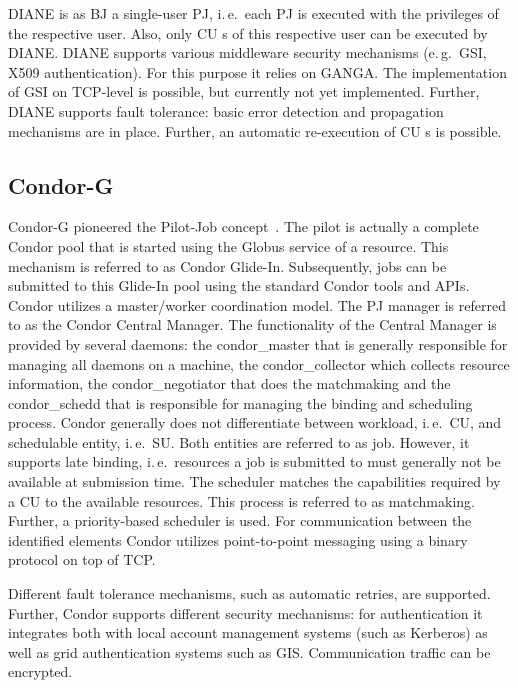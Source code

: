 \documentclass[conference,final]{IEEEtran}
\newcommand{\cu}{CU\xspace}
\newcommand{\upp}{\vspace*{-0.5em}}
\begin{document}
DIANE is as BJ a single-user PJ, i.\,e.\ each PJ is executed with the
privileges of the respective user. Also, only \cu s of this respective user can be
executed by DIANE. DIANE supports various middleware security mechanisms
(e.\,g.\ GSI, X509 authentication). For this purpose it relies on GANGA. The
implementation of GSI on TCP-level is possible, but currently not yet
implemented. Further, DIANE supports fault tolerance: basic error detection and
propagation mechanisms are in place. Further, an automatic re-execution of \cu s
is possible.

\upp
\subsection{Condor-G\upp\upp}

Condor-G pioneered the Pilot-Job concept~\cite{condor-g}. The pilot is
actually a complete Condor pool that is started using the Globus
service of a resource. This mechanism is referred to as Condor
Glide-In. Subsequently, jobs can be submitted to this Glide-In pool
using the standard Condor tools and APIs. Condor utilizes a
master/worker coordination model. The PJ manager is referred to as the
Condor Central Manager. The functionality of the Central Manager is
provided by several daemons: the condor\_master that is generally
responsible for managing all daemons on a machine, the
condor\_collector which collects resource information, the
condor\_negotiator that does the matchmaking and the condor\_schedd
that is responsible for managing the binding and scheduling
process. Condor generally does not differentiate between workload,
i.\,e.\ \cu, and schedulable entity, i.\,e.\ SU. Both entities are
referred to as job. However, it supports late binding, i.\,e.\
resources a job is submitted to must generally not be available at
submission time. The scheduler matches the capabilities required by a
\cu to the available resources. This process is referred to as
matchmaking. Further, a priority-based scheduler is used. For
communication between the identified elements Condor utilizes
point-to-point messaging using a binary protocol on top of TCP.

Different fault tolerance mechanisms, such as automatic retries, are
supported.  Further, Condor supports different security mechanisms:
for authentication it integrates both with local account management
systems (such as Kerberos) as well as grid authentication systems such
as GIS. Communication traffic can be encrypted.
\end{document}
